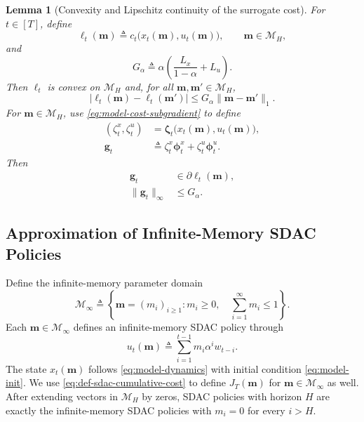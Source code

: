\documentclass[journal]{IEEEtran}
\newtheorem{lemma}{Lemma}
\theoremstyle{remark}
\begin{document}
\begin{lemma}[Convexity and Lipschitz continuity of the surrogate cost]
\label{lem:sdac-surrogate}
For $t\in[T]$, define
\begin{equation}
\label{eq:def-surrogate-cost}
\ell_t(\mathbf{m})
\triangleq
c_t\bigl(x_t(\mathbf{m}),u_t(\mathbf{m})\bigr),
\qquad
\mathbf{m}\in\mathcal{M}_H,
\end{equation}
and
\begin{equation}
\label{eq:def-surrogate-G}
G_\alpha
\triangleq
\alpha\left(\frac{L_x}{1-\alpha}+L_u\right).
\end{equation}
Then $\ell_t$ is convex on $\mathcal{M}_H$ and, for all
$\mathbf{m},\mathbf{m}'\in\mathcal{M}_H$,
\begin{equation}
\label{eq:surr-lipschitz}
|\ell_t(\mathbf{m})-\ell_t(\mathbf{m}')|
\le
G_\alpha\|\mathbf{m}-\mathbf{m}'\|_1.
\end{equation}
For $\mathbf{m}\in\mathcal{M}_H$, use \eqref{eq:model-cost-subgradient} to define
\begin{equation}
\label{eq:surr-subgradient}
\begin{aligned}
(\zeta_t^x,\zeta_t^u)
&=
\boldsymbol{\zeta}_t\bigl(x_t(\mathbf{m}),u_t(\mathbf{m})\bigr), \\
\mathbf{g}_t
&\triangleq
\zeta_t^x\boldsymbol{\phi}_t^x
+\zeta_t^u\boldsymbol{\phi}_t^u.
\end{aligned}
\end{equation}
Then
\begin{align}
\mathbf{g}_t&\in\partial\ell_t(\mathbf{m}),
\label{eq:surr-subgradient-membership}\\
\|\mathbf{g}_t\|_\infty&\le G_\alpha.
\label{eq:surr-subgradient-bound}
\end{align}
\end{lemma}

\subsection{Approximation of Infinite-Memory SDAC Policies}
\label{subsec:infinite-memory-sdac}

Define the infinite-memory parameter domain
\begin{equation}
\label{eq:def-infinite-simplex}
\mathcal{M}_\infty
\triangleq
\left\{
\mathbf{m}=(m_i)_{i\ge1}:m_i\ge0,\quad
\sum_{i=1}^{\infty}m_i\le1
\right\}.
\end{equation}
Each $\mathbf{m}\in\mathcal{M}_\infty$ defines an infinite-memory SDAC policy
through
\begin{equation}
\label{eq:def-infinite-sdac-policy}
u_t(\mathbf{m})
\triangleq
\sum_{i=1}^{t-1}m_i\alpha^i w_{t-i}.
\end{equation}
The state $x_t(\mathbf{m})$ follows \eqref{eq:model-dynamics} with initial
condition \eqref{eq:model-init}.
We use \eqref{eq:def-sdac-cumulative-cost} to define $J_T(\mathbf{m})$ for
$\mathbf{m}\in\mathcal{M}_\infty$ as well.
After extending vectors in $\mathcal{M}_H$ by zeros, SDAC policies with horizon $H$
are exactly the infinite-memory SDAC policies with $m_i=0$ for every $i>H$.
\end{document}
